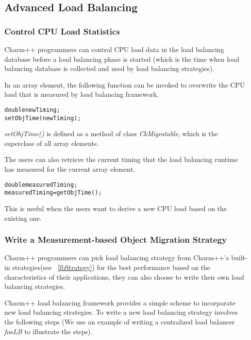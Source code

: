 
\subsection{Advanced Load Balancing}

\label{advancedlb}

\subsubsection{Control CPU Load Statistics}

Charm++ programmers can control CPU load data in the load balancing database
before a load balancing phase is started (which is the time when load balancing
database is collected and used by load balancing strategies).

In an array element, the following function can be invoked to overwrite the 
CPU load that is measured by load balancing framework.

\begin{alltt}
   double newTiming;
   setObjTime(newTiming);
\end{alltt}

{\em setObjTime()} is defined as a method of class {\em CkMigratable}, which is
the superclass of all array elements.

The users can also retrieve the current timing that the load balancing runtime
has measured for the current array element. 
 
\begin{alltt} 
   double measuredTiming; 
   measuredTiming = getObjTime(); 
\end{alltt}

This is useful when the users want to derive a new CPU load based on the 
existing one.

\subsubsection{Write a Measurement-based Object Migration Strategy}
\label{writelb}

Charm++ programmers can pick load balancing strategy from Charm++'s built-in
strategies(see ~\ref{lbStrategy}) for the best performance based on the 
characteristics of their applications, they can also choose to write their 
own load balancing strategies.

Charm++ load balancing framework provides a simple scheme to incorporate new 
load balancing strategies. To write a new load balancing strategy
involves the following steps (We use an example of writing a centralized
load balancer {\em fooLB} to illustrate the steps).


